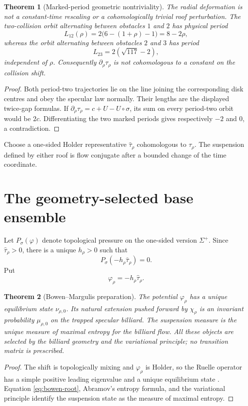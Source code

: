 \documentclass[11pt,reqno]{amsart}
\newtheorem{theorem}{Theorem}[section]
\theoremstyle{definition}
\theoremstyle{remark}
\begin{document}
\begin{theorem}[Marked-period geometric nontriviality]\label{thm:marked-period}
The radial deformation is not a constant-time rescaling or a cohomologically
trivial roof perturbation.  The two-collision orbit alternating between
obstacles $1$ and $2$ has physical period
\[
 L_{12}(\rho)=2\bigl(6-(1+\rho)-1\bigr)=8-2\rho,
\]
whereas the orbit alternating between obstacles $2$ and $3$ has period
\[
 L_{23}=2(\sqrt{117}-2),
\]
independent of $\rho$.  Consequently $\partial_\rho\tau_\rho$ is not
cohomologous to a constant on the collision shift.
\end{theorem}
\begin{proof}
Both period-two trajectories lie on the line joining the corresponding disk
centres and obey the specular law normally.  Their lengths are the displayed
twice-gap formulas.  If $\partial_\rho\tau_\rho=c+U-U\circ\sigma$, its sum on
every period-two orbit would be $2c$.  Differentiating the two marked periods
gives respectively $-2$ and $0$, a contradiction.
\end{proof}

Choose a one-sided Holder representative $\widehat\tau_\rho$ cohomologous to
$\tau_\rho$.  The suspension defined by either roof is flow conjugate after a
bounded change of the time coordinate.

\section{The geometry-selected base ensemble}\label{sec:base-ensemble}
Let $P_\sigma(\varphi)$ denote topological pressure on the one-sided version
$\Sigma^+$.  Since $\widehat\tau_\rho>0$, there is a unique $h_\rho>0$ such
that
\begin{equation}\label{eq:bowen-root}
 P_\sigma(-h_\rho\widehat\tau_\rho)=0.
\end{equation}
Put
\[
 \varphi_\rho=-h_\rho\widehat\tau_\rho.
\]

\begin{theorem}[Bowen--Margulis preparation]\label{thm:BM}
The potential $\varphi_\rho$ has a unique equilibrium state $\nu_{\rho,0}$.
Its natural extension pushed forward by $\chi_\rho$ is an invariant
probability $\mu_{\rho,0}$ on the trapped specular billiard.  The suspension
measure is the unique measure of maximal entropy for the billiard flow.
All these objects are selected by the billiard geometry and the variational
principle; no transition matrix is prescribed.
\end{theorem}
\begin{proof}
The shift is topologically mixing and $\varphi_\rho$ is Holder, so the Ruelle
operator has a simple positive leading eigenvalue and a unique equilibrium
state \cite{Bowen1975,Ruelle1978,ParryPollicott1990}.  Equation
\eqref{eq:bowen-root}, Abramov's entropy formula, and the variational principle
identify the suspension state as the measure of maximal entropy.
\end{proof}
\end{document}

